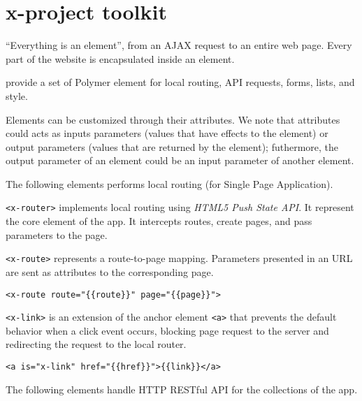 \section{x-project toolkit}\label{sec:toolkit}

``Everything is an element'', from an AJAX request to an entire web page. Every part of the website is encapsulated inside an element. 

 provide a set of Polymer element for local routing, API requests, forms, lists, and style. 

Elements can be customized through their attributes. We note that attributes could acts as inputs parameters (values that have effects to the element) or output parameters (values that are returned by the element); futhermore, the output parameter of an element could be an input parameter of another element.  

\vspace{0.2cm}

The following elements performs local routing (for Single Page Application).

\vspace{0.2cm}

\texttt{<x-router>} implements local routing using \emph{HTML5 Push State API}. It represent the core element of the app. It intercepts routes, create pages, and pass parameters to the page.

\vspace{0.2cm}

\texttt{<x-route>} represents a route-to-page mapping. 
Parameters presented in an URL are sent as attributes to the corresponding page.

\begin{lstlisting}[language=HTML5]
<x-route route="{{route}}" page="{{page}}">
\end{lstlisting}

\texttt{<x-link>} is an extension of the anchor element \texttt{<a>} that prevents the default behavior when a click event occurs, blocking page request to the server and redirecting the request to the local router. 

\begin{lstlisting}[language=HTML5]
<a is="x-link" href="{{href}}">{{link}}</a>
\end{lstlisting}

The following elements handle HTTP RESTful API for the collections of the app.

\vspace{0.2cm}

